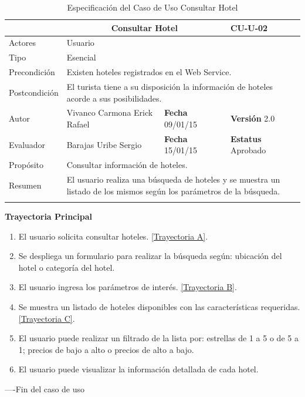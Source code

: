 \begin{longtable}{|p{2.5cm}|p{6.4cm}|p{2cm}|p{2cm}|}
	\hline
		\rowcolor[RGB]{255,102,102}{Caso de Uso}&\multicolumn{2}{c}{Consultar Hotel}&{\textbf{CU-U-02}}\\
	\hline
		{Actores}&\multicolumn{3}{p{11.2cm}|}{Usuario}\\
	\hline
		{Tipo}&\multicolumn{3}{p{11.2cm}|}{Esencial}\\
	\hline
		{Precondición}&\multicolumn{3}{p{11.2cm}|}{	Existen hoteles registrados en el Web Service.}\\
	\hline
		{Postcondición}&\multicolumn{3}{p{11.2cm}|}{El turista tiene a su disposición la información de hoteles acorde a sus posibilidades.}\\
	\hline
		{Autor}&{Vivanco Carmona Erick Rafael}&{\textbf{Fecha} 09/01/15}&{\textbf{Versión} 2.0}\\
			\hline
		{Evaluador}&{Barajas Uribe Sergio}&{\textbf{Fecha} 15/01/15}&{\textbf{Estatus} Aprobado}\\
	\hline
		{Propósito}&\multicolumn{3}{p{11.2cm}|}{Consultar información de hoteles.}\\
	\hline
		{Resumen}&\multicolumn{3}{p{11.2cm}|}{El usuario realiza una búsqueda de hoteles y se muestra un listado de los mismos según los parámetros de la búsqueda. }\\	
	\hline
	\caption[Especificación del Caso de Uso Consultar Hotel]{Especificación del Caso de Uso Consultar Hotel}
    	\label{tab:cuConsultarHotel}
\end{longtable}

\begin{flushleft}
	\textbf{Trayectoria Principal}\\
	\begin{enumerate}
		\item El usuario solicita consultar hoteles. \hyperlink{TrayectoriaA_CU-U-02}{[Trayectoria A]}.
		\item Se despliega un formulario para realizar la búsqueda según: ubicación del hotel o categoría del hotel.
		\item El usuario ingresa los parámetros de interés. \hyperlink{TrayectoriaB_CU-U-02}{[Trayectoria B]}.
		\item Se  muestra un listado de hoteles disponibles con las características requeridas. \hyperlink{TrayectoriaC_CU-U-02}{[Trayectoria C]}.
		\item El usuario puede realizar un filtrado de la lista por: estrellas de 1 a 5 o de 5 a 1; precios de bajo a alto o precios de alto a bajo.
		\item El usuario puede visualizar la información detallada de cada hotel.
	\end{enumerate}
\end{flushleft}
----Fin del caso de uso

